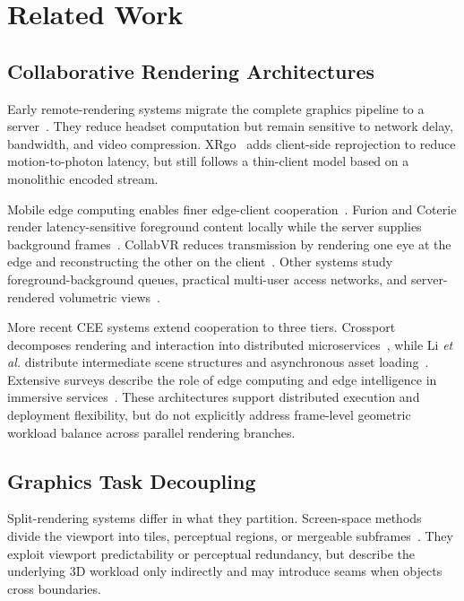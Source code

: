 \documentclass[acmsmall]{acmart}
\begin{document}
	
\section{Related Work}

\subsection{Collaborative Rendering Architectures}

Early remote-rendering systems migrate the complete graphics pipeline to a server~\cite{shea_cloud_2013,cai_survey_2016,zhao_virtual_2021}. They reduce headset computation but remain sensitive to network delay, bandwidth, and video compression. XRgo~\cite{gao_xrgo_2025} adds client-side reprojection to reduce motion-to-photon latency, but still follows a thin-client model based on a monolithic encoded stream.

Mobile edge computing enables finer edge-client cooperation~\cite{shi_edge_2016,mach_mobile_2017}. Furion and Coterie render latency-sensitive foreground content locally while the server supplies background frames~\cite{lai_furion_2020,meng_coterie_2020}. CollabVR reduces transmission by rendering one eye at the edge and reconstructing the other on the client~\cite{ke_collabvr_2023}. Other systems study foreground-background queues, practical multi-user access networks, and server-rendered volumetric views~\cite{xu_wireless_2025,yeregui_edge_2024,gul_cloud_2020,son_split_2020}.

More recent CEE systems extend cooperation to three tiers. Crossport decomposes rendering and interaction into distributed microservices~\cite{su_crossport_2026}, while Li \emph{et al.} distribute intermediate scene structures and asynchronous asset loading~\cite{li_toward_2024}. Extensive surveys describe the role of edge computing and edge intelligence in immersive services~\cite{xu_edge_2023,tang_systematic_2023}. These architectures support distributed execution and deployment flexibility, but do not explicitly address frame-level geometric workload balance across parallel rendering branches.

\subsection{Graphics Task Decoupling}

Split-rendering systems differ in what they partition. Screen-space methods divide the viewport into tiles, perceptual regions, or mergeable subframes~\cite{corbillon_viewport-adaptive_2017,cantory_image-space_2023}. They exploit viewport predictability or perceptual redundancy, but describe the underlying 3D workload only indirectly and may introduce seams when objects cross boundaries.
\end{document}
